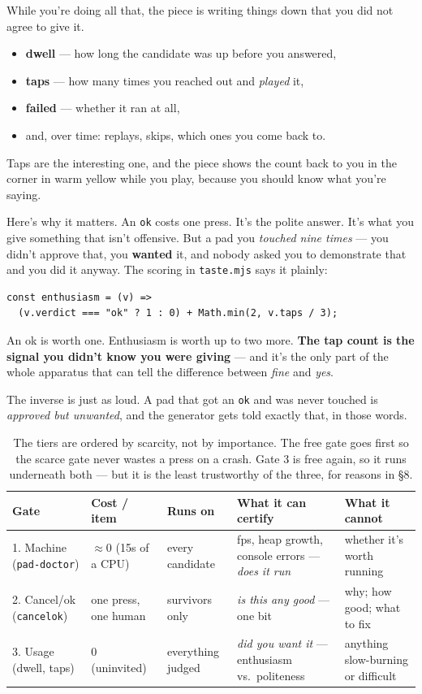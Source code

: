 \documentclass[10pt,letterpaper,twocolumn]{article}
\begin{document}
While you're doing all that, the piece is writing things down that you did not agree to give it.

\begin{itemize}
  \item \textbf{dwell} --- how long the candidate was up before you answered,
  \item \textbf{taps} --- how many times you reached out and \emph{played} it,
  \item \textbf{failed} --- whether it ran at all,
  \item and, over time: replays, skips, which ones you come back to.
\end{itemize}

Taps are the interesting one, and the piece shows the count back to you in the corner in warm yellow while you play, because you should know what you're saying.

Here's why it matters. An \texttt{ok} costs one press. It's the polite answer. It's what you give something that isn't offensive. But a pad you \emph{touched nine times} --- you didn't approve that, you \textbf{wanted} it, and nobody asked you to demonstrate that and you did it anyway. The scoring in \texttt{taste.mjs} says it plainly:

\begin{lstlisting}
const enthusiasm = (v) =>
  (v.verdict === "ok" ? 1 : 0) + Math.min(2, v.taps / 3);
\end{lstlisting}

An ok is worth one. Enthusiasm is worth up to two more. \textbf{The tap count is the signal you didn't know you were giving} --- and it's the only part of the whole apparatus that can tell the difference between \emph{fine} and \emph{yes}.

The inverse is just as loud. A pad that got an \texttt{ok} and was never touched is \emph{approved but unwanted}, and the generator gets told exactly that, in those words.

\begin{table}[t]
\footnotesize
\centering
\begin{tabularx}{\textwidth}{lllXX}
\toprule
\textbf{Gate} & \textbf{Cost / item} & \textbf{Runs on} & \textbf{What it can certify} & \textbf{What it cannot} \\
\midrule
1. Machine (\texttt{pad-doctor}) & $\approx$0 (15s of a CPU) & every candidate & fps, heap growth, console errors --- \emph{does it run} & whether it's worth running \\
2. Cancel/ok (\texttt{cancelok}) & one press, one human & survivors only & \emph{is this any good} --- one bit & why; how good; what to fix \\
3. Usage (dwell, taps) & 0 (uninvited) & everything judged & \emph{did you want it} --- enthusiasm vs.\ politeness & anything slow-burning or difficult \\
\bottomrule
\end{tabularx}
\caption{The tiers are ordered by scarcity, not by importance. The free gate goes first so the scarce gate never wastes a press on a crash. Gate 3 is free again, so it runs underneath both --- but it is the least trustworthy of the three, for reasons in \S8.}
\end{table}
\end{document}

